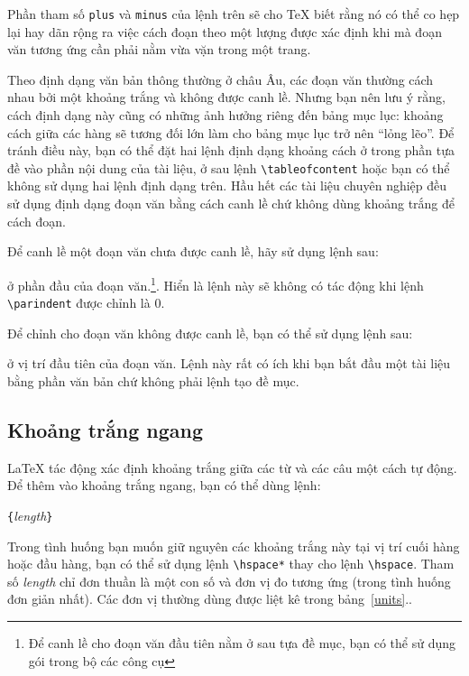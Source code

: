 Phần tham số \texttt{plus} và \texttt{minus} của lệnh trên sẽ cho
\TeX{} biết rằng nó có thể co hẹp lại hay dãn rộng ra việc cách
đoạn theo một lượng được xác định khi mà đoạn văn tương ứng cần
phải nằm vừa vặn trong một trang.

Theo định dạng văn bản thông thường ở châu Âu, các đoạn văn thường
cách nhau bởi một khoảng trắng và không được canh lề. Nhưng bạn
nên lưu ý rằng, cách định dạng này cũng có những ảnh hưởng riêng
đến bảng mục lục: khoảng cách giữa các hàng sẽ tương đối lớn làm
cho bảng mục lục trở nên ``lỏng lẽo''. Để tránh điều này, bạn có
thể đặt hai lệnh định dạng khoảng cách ở trong phần tựa đề vào
phần nội dung của tài liệu, ở sau lệnh \verb|\tableofcontent| hoặc
bạn có thể không sử dụng hai lệnh định dạng trên. Hầu hết các tài
liệu chuyên nghiệp đều sử dụng định dạng đoạn văn bằng cách canh
lề chứ không dùng khoảng trắng để cách đoạn.

Để canh lề một đoạn văn chưa được canh lề, hãy sử dụng lệnh sau:

\begin{lscommand}
\end{lscommand}
\noindent ở phần đầu của đoạn văn.\footnote{Để canh lề cho đoạn
văn đầu tiên nằm ở sau tựa đề mục, bạn có thể sử dụng gói
 trong bộ các công cụ}. Hiển là lệnh này sẽ không
có tác động khi lệnh \verb|\parindent| được chỉnh là 0.

Để chỉnh cho đoạn văn không được canh lề, bạn có thể sử dụng lệnh
sau:

\begin{lscommand}
\end{lscommand}
\noindent ở vị trí đầu tiên của đoạn văn. Lệnh này rất có ích khi
bạn bắt đầu một tài liệu bằng phần văn bản chứ không phải lệnh tạo
đề mục.

\subsection{Khoảng trắng ngang}
\label{sec:hspace} \LaTeX{} tác động xác định khoảng trắng giữa
các từ và các câu một cách tự động. Để thêm vào khoảng trắng
ngang, bạn có thể dùng lệnh:

\begin{lscommand}
\verb|{|\emph{length}\verb|}|
\end{lscommand}
Trong tình huống bạn muốn giữ nguyên các khoảng trắng này tại vị
trí cuối hàng hoặc đầu hàng, bạn có thể sử dụng lệnh
\verb|\hspace*| thay cho lệnh \verb|\hspace|. Tham số
\emph{length} chỉ đơn thuần là một con số và đơn vị đo tương ứng
(trong tình huống đơn giản nhất). Các đơn vị thường dùng được liệt
kê trong bảng~\ref{units}..

